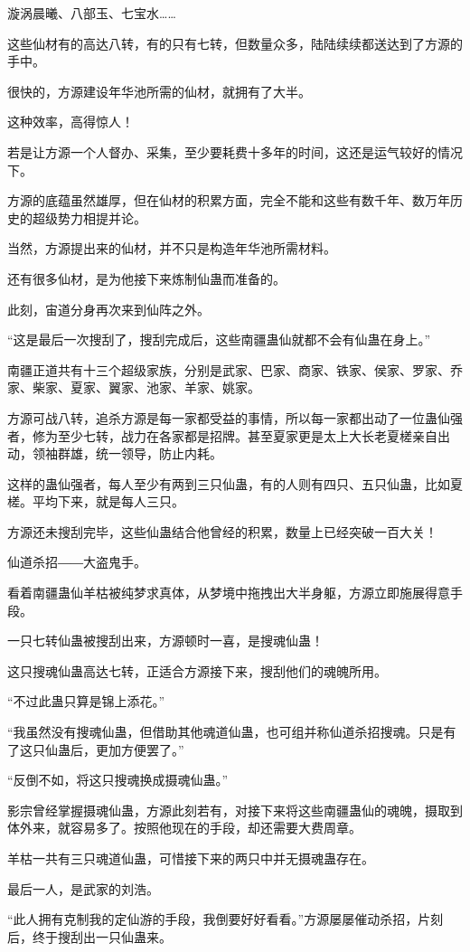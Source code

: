 \begin{this_body}
漩涡晨曦、八部玉、七宝水……

这些仙材有的高达八转，有的只有七转，但数量众多，陆陆续续都送达到了方源的手中。

很快的，方源建设年华池所需的仙材，就拥有了大半。

这种效率，高得惊人！

若是让方源一个人督办、采集，至少要耗费十多年的时间，这还是运气较好的情况下。

方源的底蕴虽然雄厚，但在仙材的积累方面，完全不能和这些有数千年、数万年历史的超级势力相提并论。

当然，方源提出来的仙材，并不只是构造年华池所需材料。

还有很多仙材，是为他接下来炼制仙蛊而准备的。

此刻，宙道分身再次来到仙阵之外。

“这是最后一次搜刮了，搜刮完成后，这些南疆蛊仙就都不会有仙蛊在身上。”

南疆正道共有十三个超级家族，分别是武家、巴家、商家、铁家、侯家、罗家、乔家、柴家、夏家、翼家、池家、羊家、姚家。

方源可战八转，追杀方源是每一家都受益的事情，所以每一家都出动了一位蛊仙强者，修为至少七转，战力在各家都是招牌。甚至夏家更是太上大长老夏槎亲自出动，领袖群雄，统一领导，防止内耗。

这样的蛊仙强者，每人至少有两到三只仙蛊，有的人则有四只、五只仙蛊，比如夏槎。平均下来，就是每人三只。

方源还未搜刮完毕，这些仙蛊结合他曾经的积累，数量上已经突破一百大关！

仙道杀招――大盗鬼手。

看着南疆蛊仙羊枯被纯梦求真体，从梦境中拖拽出大半身躯，方源立即施展得意手段。

一只七转仙蛊被搜刮出来，方源顿时一喜，是搜魂仙蛊！

这只搜魂仙蛊高达七转，正适合方源接下来，搜刮他们的魂魄所用。

“不过此蛊只算是锦上添花。”

“我虽然没有搜魂仙蛊，但借助其他魂道仙蛊，也可组并称仙道杀招搜魂。只是有了这只仙蛊后，更加方便罢了。”

“反倒不如，将这只搜魂换成摄魂仙蛊。”

影宗曾经掌握摄魂仙蛊，方源此刻若有，对接下来将这些南疆蛊仙的魂魄，摄取到体外来，就容易多了。按照他现在的手段，却还需要大费周章。

羊枯一共有三只魂道仙蛊，可惜接下来的两只中并无摄魂蛊存在。

最后一人，是武家的刘浩。

“此人拥有克制我的定仙游的手段，我倒要好好看看。”方源屡屡催动杀招，片刻后，终于搜刮出一只仙蛊来。


\end{this_body}
